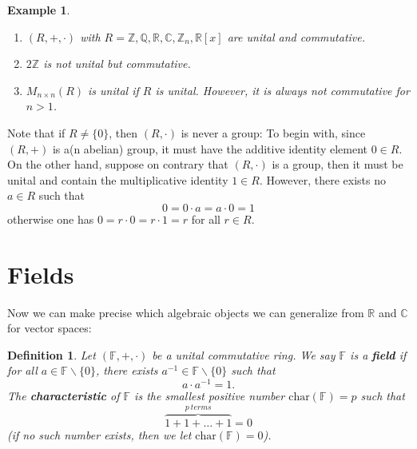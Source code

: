 \documentclass[12pt]{amsbook}
\newtheorem{definition}[theorem]{Definition}
\newtheorem{example}[theorem]{Example}
\begin{document}
\begin{example}\
\begin{enumerate}
    \item $(R,+,\cdot)$ with $R = \mathbb{Z}, \mathbb{Q}, \mathbb{R}, \mathbb{C}, \mathbb{Z}_n, \mathbb{R}[x]$ are unital and commutative.
    \item $2\mathbb{Z}$ is not unital but commutative.
    \item $M_{n\times n}(R)$ is unital if $R$ is unital. However, it is always not commutative for $n > 1$.
\end{enumerate}
\end{example}

Note that if $R \neq \{0\}$, then $(R,\cdot)$ is never a group: To begin with, since $(R,+)$ is a(n abelian) group, it must have the additive identity element $0 \in R$. On the other hand, suppose on contrary that $(R,\cdot)$ is a group, then it must be unital and contain the multiplicative identity $1 \in R$. However, there exists no $a \in R$ such that
$$0 = 0 \cdot a = a \cdot 0 = 1$$
otherwise one has $0 = r \cdot 0 = r \cdot 1 = r$ for all $r \in R$.

\section{Fields}
Now we can make precise which algebraic objects we can generalize from $\mathbb{R}$ and $\mathbb{C}$ for vector spaces:
\begin{definition}
    Let $(\mathbb{F},+,\cdot)$ be a unital commutative ring. We say $\mathbb{F}$ is a {\bf field} if for all $a \in \mathbb{F} \backslash \{0\}$, there exists $a^{-1} \in \mathbb{F} \backslash \{0\}$ such that
    $$a \cdot a^{-1} = 1.$$
    The {\bf characteristic} of $\mathbb{F}$ is the smallest positive number $\mathrm{char}(\mathbb{F}) = p$ such that 
    $$\overbrace{1+1+ \dots + 1}^{p\ terms} = 0$$ 
    (if no such number exists, then we let $\mathrm{char}(\mathbb{F}) = 0$).
\end{definition}
\end{document}
